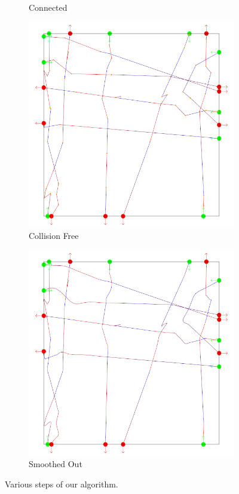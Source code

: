 \begin{figure}[t]
\begin{subfigure}[b]{0.24\linewidth}
 	\caption{Connected}
 \end{subfigure}
 \begin{subfigure}[b]{0.24\linewidth}
 	\includegraphics[width=\linewidth]{images/steps-collisionFree.png}
 	\caption{Collision Free}
 \end{subfigure}
 \begin{subfigure}[b]{0.24\linewidth}
 	\includegraphics[width=\linewidth]{images/steps-smoothed.png}
 	\caption{Smoothed Out}
 \end{subfigure}
 \caption{Various steps of our algorithm.}
 \label{fig:res:steps}
\end{figure}



